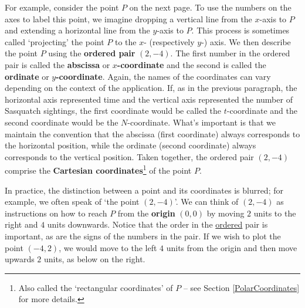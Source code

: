 \documentclass{ximera}
\begin{document}
\medskip

For example, consider the point $P$ on the next page.  To use the numbers on the axes to label this point, we imagine dropping a vertical line from the $x$-axis to $P$ and extending a horizontal line from the $y$-axis to $P$.  This process is sometimes called `projecting' the point $P$ to the $x$- (respectively $y$-) axis.  We then describe the point $P$ using the  \textbf{ordered pair} $(2,-4)$.  The first number in the ordered pair is called the  \textbf{abscissa} or  \textbf{\boldmath $x$-coordinate} and the second is called the  \textbf{ordinate} or  \textbf{\boldmath $y$-coordinate}.  Again, the names of the coordinates can vary depending on the context of the application. If, as in the previous paragraph, the horizontal axis represented time and the vertical axis represented the number of Sasquatch sightings, the first coordinate would be called the $t$-coordinate and the second coordinate would be the $N$-coordinate. What's important is that we maintain the convention that the abscissa (first coordinate) always corresponds to the horizontal position, while the ordinate (second coordinate) always corresponds to the vertical position.  Taken together, the ordered pair $(2,-4)$ comprise the \textbf{Cartesian coordinates}\footnote{Also called the `rectangular coordinates' of $P$ -- see Section \ref{PolarCoordinates} for more details.} of the point $P$. 

\medskip

In practice, the distinction between a point and its coordinates is blurred; for example, we often speak of `the point $(2,-4)$'.  We can think of $(2,-4)$ as instructions on how to reach $P$ from the  {\bf origin} $(0, 0)$ by moving $2$ units to the right and $4$ units downwards.  Notice that the order in the \underline{ordered} pair is important, as are the signs of the numbers in the pair. If we wish to plot the point $(-4,2)$, we would move to the left $4$ units from the origin and then move upwards $2$ units, as below on the right.

\medskip
\end{document}
